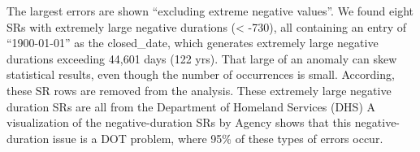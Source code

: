 \documentclass[12pt, titlepage]{article}
\begin{document}

	
The largest errors are shown ``excluding extreme negative values''. We found 
eight SRs with extremely large negative durations (\textless{} -730), all containing 
an entry of ``1900-01-01'' as the closed\_date, which generates extremely large 
negative durations exceeding 44,601 days (122 yrs). That large of an anomaly 
can skew statistical results, even though the number of occurrences is 
small. According, these  SR rows are removed from the analysis. These 
extremely large negative duration SRs are all from the 
Department of Homeland Services (DHS) A visualization of the 
negative-duration SRs by Agency shows that this negative-duration 
issue is a DOT problem, where 95\% of these types of errors occur. 
	
\end{document}
